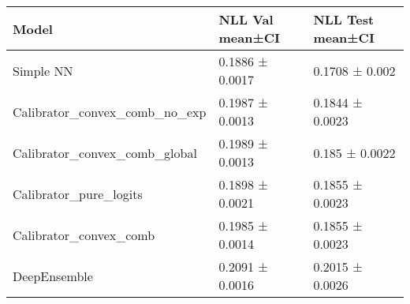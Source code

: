 \begin{tabular}{lll}
\toprule
Model & NLL Val mean±CI & NLL Test mean±CI \\
\midrule
Simple NN & 0.1886 ± 0.0017 & 0.1708 ± 0.002 \\
Calibrator_convex_comb_no_exp & 0.1987 ± 0.0013 & 0.1844 ± 0.0023 \\
Calibrator_convex_comb_global & 0.1989 ± 0.0013 & 0.185 ± 0.0022 \\
Calibrator_pure_logits & 0.1898 ± 0.0021 & 0.1855 ± 0.0023 \\
Calibrator_convex_comb & 0.1985 ± 0.0014 & 0.1855 ± 0.0023 \\
DeepEnsemble & 0.2091 ± 0.0016 & 0.2015 ± 0.0026 \\
\bottomrule
\end{tabular}
